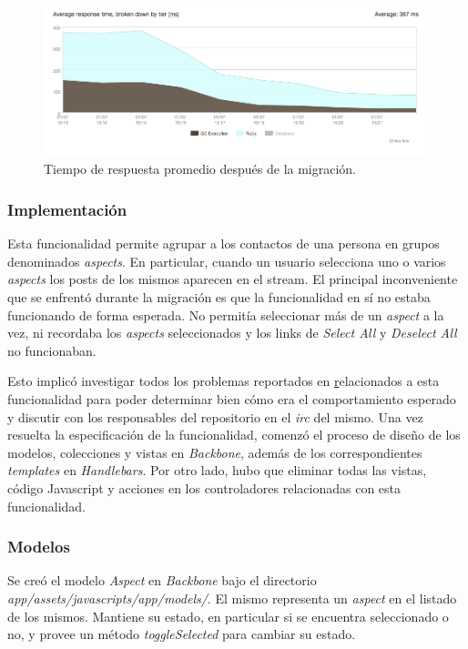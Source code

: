 \begin{figure}[h!]
\centering
\includegraphics[width=1\textwidth]{figuras/problemas/problemas-stream.png}
  \caption{Tiempo de respuesta promedio después de la migración.\cite{diasp_backbone}}
    \label{fig.problemas-stream}
\end{figure}


\subsubsection{Implementación}

Esta funcionalidad permite agrupar a los contactos de una persona en grupos denominados \emph{aspects}. En particular, cuando un usuario selecciona uno o varios \emph{aspects}
los posts de los mismos aparecen en el stream. El principal inconveniente que se enfrentó durante la migración es que la funcionalidad en sí no estaba funcionando de forma
esperada. No permitía seleccionar más de un \emph{aspect} a la vez, ni recordaba los \emph{aspects} seleccionados y los links de \emph{Select All} y \emph{Deselect All} no
funcionaban.

Esto implicó investigar todos los problemas reportados en \href{https://github.com/diaspora/diaspora/issues?state=open} relacionados a esta funcionalidad para poder determinar bien
cómo era el comportamiento esperado y discutir con los responsables del repositorio en el \emph{irc} del mismo. Una vez resuelta la especificación de la funcionalidad, comenzó el
proceso de diseño de los modelos, colecciones y vistas en \emph{Backbone}, además de los correspondientes \emph{templates} en \emph{Handlebars}. Por otro lado, hubo que eliminar todas
las vistas, código Javascript y acciones en los controladores relacionadas con esta funcionalidad.

\subsubsection{Modelos}

Se creó el modelo \emph{Aspect} en \emph{Backbone} bajo el directorio\\
\emph{app/assets/javascripts/app/models/}. El mismo representa un \emph{aspect} en el listado de los mismos.
Mantiene su estado, en particular si se encuentra seleccionado o no, y provee un método \emph{toggleSelected} para cambiar su estado.

